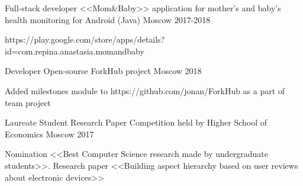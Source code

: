


\begin{cventries}
	
		
	
\cventry
{Full-stack developer} %
{<<Mom\&Baby>> application for mother's and baby's health monitoring for Android  (Java) } %
{Moscow} %
{2017-2018} %
{ %
	\begin{cvitems}
		\item {https://play.google.com/store/apps/details?id=com.repina.anastasia.momandbaby}
	\end{cvitems}
}

	

\cventry
{Developer} %
{Open-sourse ForkHub project} %
{Moscow} %
{2018} %
{ %
	\begin{cvitems}
		\item {Added milestones module to https://github.com/jonan/ForkHub as a part of team project}
	\end{cvitems}
}	
	

\cventry
{Laureate} %
{Student Research Paper Competition held by Higher School of Economics} %
{Moscow} %
{2017} %
{ %
	\begin{cvitems}
		\item {Nomination <<Best Computer Science research made by undergraduate students>>. Research paper <<Building aspect hierarchy based on user reviews about electronic devices>>}
	\end{cvitems}
}



\end{cventries}
